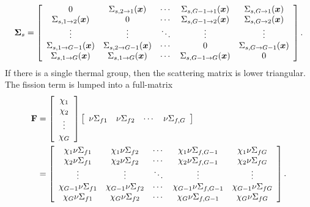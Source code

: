 \begin{align}
  \boldsymbol\Sigma_s = \left[ \begin{array}{c c c c c}
  0	& \Sigma_{s,2\rightarrow 1}(\bm{x})			& \cdots	& \Sigma_{s,G-1\rightarrow 1}(\bm{x})				& \Sigma_{s,G\rightarrow 1}(\bm{x})			\\
  \Sigma_{s,1\rightarrow 2}(\bm{x})			& 0	& \cdots	& \Sigma_{s,G-1\rightarrow 2}(\bm{x})				& \Sigma_{s,G\rightarrow 2}(\bm{x})				\\
  \vdots	& \vdots	& \ddots	& \vdots		& \vdots	\\
  \Sigma_{s,1\rightarrow G-1}(\bm{x})		& \Sigma_{s,2\rightarrow G-1}(\bm{x})		& \cdots	& 0	& \Sigma_{s,G\rightarrow G-1}(\bm{x})				\\
  \Sigma_{s,1\rightarrow G}(\bm{x})		& \Sigma_{s,1\rightarrow G}(\bm{x})		& \cdots	& \Sigma_{s,G-1\rightarrow G}(\bm{x})		& 0	\\ \end{array} \right] .
\end{align}
If there is a single thermal group, then the scattering matrix is lower triangular. The fission term is lumped into a full-matrix
\begin{align}
  \mathbf{F} &= 
  \left[ \begin{array}{c} \chi_1 \\ \chi_2 \\ \vdots \\ \chi_G \end{array} \right]
  \left[ \begin{array}{c c c c} \nu\Sigma_{f1} & \nu\Sigma_{f2} & \cdots & \nu\Sigma_{f,G} \end{array} \right] \nonumber \\
  &= \left[ \begin{array}{c c c c c}
  \chi_1 \nu\Sigma_{f1}	& \chi_1 \nu\Sigma_{f2}			& \cdots	& \chi_1 \nu\Sigma_{f,G-1}				& \chi_1 \nu\Sigma_{fG}			\\
  \chi_2 \nu\Sigma_{f1}	& \chi_2 \nu\Sigma_{f2}			& \cdots	& \chi_2 \nu\Sigma_{f,G-1}				& \chi_2 \nu\Sigma_{fG}			\\
  \vdots	& \vdots	& \ddots	& \vdots		& \vdots	\\
  \chi_{G-1} \nu\Sigma_{f1}	& \chi_{G-1} \nu\Sigma_{f2}			& \cdots	& \chi_{G-1} \nu\Sigma_{f,G-1}	& \chi_{G-1} \nu\Sigma_{fG}			\\
  \chi_G \nu\Sigma_{f1}	& \chi_G \nu\Sigma_{f2}			& \cdots	& \chi_G \nu\Sigma_{f,G-1}				& \chi_G \nu\Sigma_{fG}			\\	 \end{array} \right] .
\end{align}

